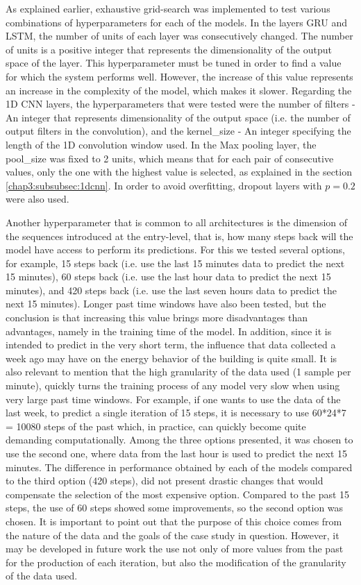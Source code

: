 As explained earlier, exhaustive grid-search was implemented to test various combinations of hyperparameters for each of the models. In the layers \ac{GRU} and \ac{LSTM}, the number of units of each layer was consecutively changed.
The number of units is a positive integer that represents the dimensionality of the output space of the layer. This hyperparameter must be tuned in order to find a value for which the system performs well. However, the increase of this value represents an increase in the complexity of the model, which makes it slower. Regarding the \ac{1D CNN} layers, the hyperparameters that were tested were the number of filters - An integer that represents dimensionality of the output space (i.e. the number of output filters in the convolution), and the kernel\_size - An integer specifying the length of the 1D convolution window used. In the Max pooling layer, the pool\_size was fixed to 2 units, which means that for each pair of consecutive values, only the one with the highest value is selected, as explained in the section \ref{chap3:subsubsec:1dcnn}. In order to avoid overfitting, dropout layers with $p=0.2$ were also used.

Another hyperparameter that is common to all architectures is the dimension of the sequences introduced at the entry-level, that is, how many steps back will the model have access to perform its predictions. For this we tested several options, for example, 15 steps back (i.e. use the last 15 minutes data to predict the next 15 minutes), 60 steps back (i.e. use the last hour data to predict the next 15 minutes), and 420 steps back (i.e. use the last seven hours data to predict the next 15 minutes). Longer past time windows have also been tested, but the conclusion is that increasing this value brings more disadvantages than advantages, namely in the training time of the model. In addition, since it is intended to predict in the very short term, the influence that data collected a week ago may have on the energy behavior of the building is quite small. It is also relevant to mention that the high granularity of the data used (1 sample per minute), quickly turns the training process of any model very slow when using very large past time windows. For example, if one wants to use the data of the last week, to predict a single iteration of 15 steps, it is necessary to use 60*24*7 = 10080 steps of the past which, in practice, can quickly become quite demanding computationally. Among the three options presented, it was chosen to use the second one, where data from the last hour is used to predict the next 15 minutes. The difference in performance obtained by each of the models compared to the third option (420 steps), did not present drastic changes that would compensate the selection of the most expensive option. Compared to the past 15 steps, the use of 60 steps showed some improvements, so the second option was chosen. It is important to point out that the purpose of this choice comes from the nature of the data and the goals of the case study in question. However, it may be developed in future work the use not only of more values from the past for the production of each iteration, but also the modification of the granularity of the data used.

